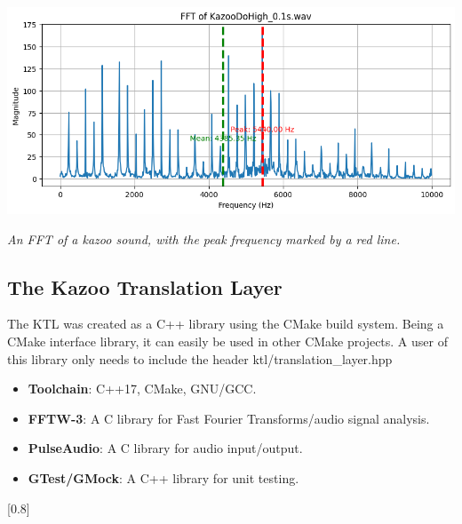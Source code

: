 \documentclass[]{article}
\begin{document}
\begin{center}
  \includegraphics[width=0.7\linewidth]{images/fft.png}

  \textit{An FFT of a kazoo sound, with the peak frequency marked by a red line.}
\end{center}

\subsection{The Kazoo Translation Layer}

The KTL was created as a C++ library using the CMake build system. Being a CMake interface library, it can easily be used in other CMake projects. A user of this library only needs to include the header ktl/translation\_layer.hpp

\begin{itemize}
  \item \textbf{Toolchain}: C++17, CMake, GNU/GCC.
  \item \textbf{FFTW-3}: A C library for Fast Fourier Transforms/audio signal analysis.
  \item \textbf{PulseAudio}: A C library for audio input/output.
  \item \textbf{GTest/GMock}: A C++ library for unit testing.
\end{itemize}

[0.8\textwidth]
\end{document}
